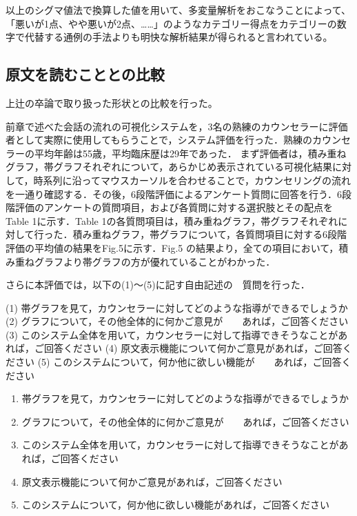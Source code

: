 \documentclass[shuuron]{kuee}
\begin{document}
以上のシグマ値法で換算した値を用いて、多変量解析をおこなうことによって、「悪いが1点、やや悪いが2点、……」のようなカテゴリー得点をカテゴリーの数字で代替する通例の手法よりも明快な解析結果が得られると言われている。

\subsection{原文を読むこととの比較}


上辻の卒論で取り扱った形状との比較を行った。

前章で述べた会話の流れの可視化システムを，3名の熟練のカウンセラーに評価者として実際に使用してもらうことで，システム評価を行った．熟練のカウンセラーの平均年齢は55歳，平均臨床歴は29年であった．
まず評価者は，積み重ねグラフ，帯グラフそれぞれについて，あらかじめ表示されている可視化結果に対して，時系列に沿ってマウスカーソルを合わせることで，カウンセリングの流れを一通り確認する．その後，6段階評価によるアンケート質問に回答を行う．6段階評価のアンケートの質問項目，および各質問に対する選択肢とその配点をTable 1に示す．Table 1の各質問項目は，積み重ねグラフ，帯グラフそれぞれに対して行った．積み重ねグラフ，帯グラフについて，各質問項目に対する6段階評価の平均値の結果をFig.5に示す．Fig.5 の結果より，全ての項目において，積み重ねグラフより帯グラフの方が優れていることがわかった．


さらに本評価では，以下の(1)～(5)に記す自由記述の　質問を行った．

(1)	帯グラフを見て，カウンセラーに対してどのような指導ができるでしょうか
(2)	グラフについて，その他全体的に何かご意見が　　あれば，ご回答ください
(3)	このシステム全体を用いて，カウンセラーに対して指導できそうなことがあれば，ご回答ください
(4)	原文表示機能について何かご意見があれば，ご回答ください
(5)	このシステムについて，何か他に欲しい機能が　　あれば，ご回答ください

\begin{enumerate}
 \item 帯グラフを見て，カウンセラーに対してどのような指導ができるでしょうか
 \item グラフについて，その他全体的に何かご意見が　　あれば，ご回答ください
 \item このシステム全体を用いて，カウンセラーに対して指導できそうなことがあれば，ご回答ください
 \item 原文表示機能について何かご意見があれば，ご回答ください
 \item このシステムについて，何か他に欲しい機能があれば，ご回答ください
\end{enumerate}
\end{document}
